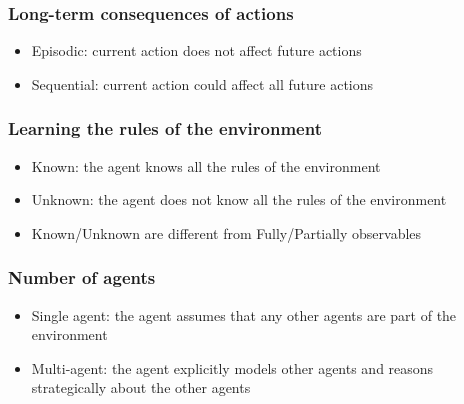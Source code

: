 \documentclass{article}
\begin{document}
\subsubsection{Long-term consequences of actions}
\begin{itemize}
\item Episodic: current action does not affect future actions
\item Sequential: current action could affect all future actions
\end{itemize}

\subsubsection{Learning the rules of the environment}
\begin{itemize}
\item Known: the agent knows all the rules of the environment
\item Unknown: the agent does not know all the rules of the environment
\item Known/Unknown are different from Fully/Partially observables
\end{itemize}

\subsubsection{Number of agents}
\begin{itemize}
\item Single agent: the agent assumes that any other agents are part of the environment
\item Multi-agent: the agent explicitly models other agents and reasons strategically about the other agents
\end{itemize}
\end{document}
